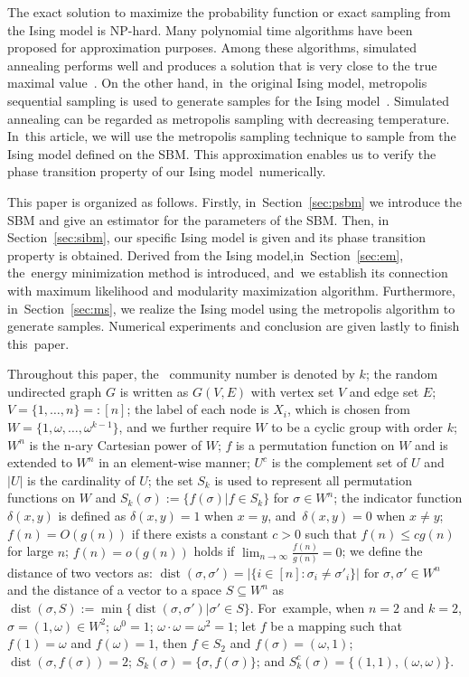 \documentclass[entropy,article,accept,moreauthors,pdftex]{Definitions/mdpi}
\newcommand{\1}{\mathbbm{1}}
\DeclareMathOperator{\Dist}{dist}
\begin{document}
The exact solution to maximize the probability function or exact sampling from the Ising model is NP-hard. Many polynomial time algorithms have been proposed for approximation purposes.
Among these algorithms, simulated annealing performs well and produces a solution that is very close to the true maximal value~\cite{liu2010detecting}.
On the other hand, in~the original Ising model,
metropolis sequential sampling is used to generate samples for the  Ising model~\cite{metropolis1953equation}. Simulated annealing can be regarded as metropolis sampling with decreasing temperature. In~this article, we will
use the metropolis sampling technique to sample from the Ising model defined on the SBM. %
This approximation enables us to verify the phase transition property of our Ising model~numerically.

This paper is organized as follows. Firstly, in~Section~\ref{sec:psbm} we introduce the SBM and give an estimator for the parameters of the SBM.
Then, in  Section~\ref{sec:sibm}, our specific Ising model is given and its phase transition property is obtained.
Derived from the Ising model,\linebreak in~Section~\ref{sec:em}, the~energy minimization method is introduced, and~we establish its connection with maximum likelihood and modularity
maximization algorithm. Furthermore, in~Section~\ref{sec:ms},
we realize the Ising model using the metropolis algorithm to generate samples. Numerical experiments and conclusion are given lastly to finish this~paper.

Throughout this paper, the~  community number is denoted by $k$;
the random undirected graph $G$ is written as $G(V,E)$ with vertex set $V$ and edge set $E$;
$V=\{1,\dots, n\} =: [n]$;
the label of each node is $X_i$, which is chosen from $W= \{1, \omega, \dots, \omega^{k-1}\}$, and we further require $W$
to be a cyclic group with order $k$;
$W^n$ is the n-ary Cartesian power of $W$; %
$f$ is a permutation function on $W$ and is extended to $W^n$ in an element-wise manner;
$U^c$ is the complement set of $U$ and $|U|$ is the cardinality of $U$;  
the set $S_k$ is used to represent all permutation functions on $W$ and $S_k(\sigma):=\{f(\sigma)| f\in S_k\}$ for $\sigma \in W^n$;
the indicator function $\delta(x,y)$ is defined as
$\delta(x,y) = 1 $ when $x=y$, and~$\delta(x,y)=0$ when $x\neq y$;
$f(n) = O(g(n))$ if there exists a constant $c > 0$ such that $ f(n) \leq c g(n)$
for large $n$; $f(n)=o(g(n))$ holds if $\lim_{n\to\infty} \frac{f(n)}{g(n)} = 0$;
we define the distance of two vectors as:
$\Dist(\sigma, \sigma')
=|\{i\in[n]:\sigma_i\neq \sigma'_i\}| \textrm{ for } \sigma,\sigma'\in W^n
$ and the distance of a vector to a space $S\subseteq W^n$
as
$\Dist(\sigma,S)
:=\min\{\Dist(\sigma, \sigma') | \sigma' \in S\}
$. For~example, when $n=2$ and $k=2$, $\sigma=(1, \omega) \in W^2$;
$\omega^0 = 1$; $\omega \cdot \omega = \omega^2 = 1$; let $f$ be a mapping such that $f(1) = \omega$ and $f(\omega)=1$,
then $f \in S_2$ and $f(\sigma) = (\omega, 1)$; $\Dist(\sigma, f(\sigma)) = 2$; $S_k(\sigma) = \{\sigma, f(\sigma)\}$; and
$S_k^c(\sigma) = \{(1, 1), (\omega, \omega)\}$.
\end{document}
